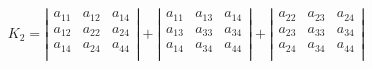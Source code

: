 \begin{equation}
K_2=
\left| 
\begin{array}{ccc}
a_{11} & a_{12} & a_{14}  \\
a_{12} & a_{22} & a_{24}  \\
a_{14} & a_{24} & a_{44}  \\
\end{array}
\right| 
+
\left| 
\begin{array}{ccc}
a_{11} & a_{13} & a_{14}  \\
a_{13} & a_{33} & a_{34}  \\
a_{14} & a_{34} & a_{44}  \\
\end{array}
\right| 
+
\left| 
\begin{array}{ccc}
a_{22} & a_{23} & a_{24}  \\
a_{23} & a_{33} & a_{34}  \\
a_{24} & a_{34} & a_{44}  \\
\end{array}
\right| 
\end{equation}

